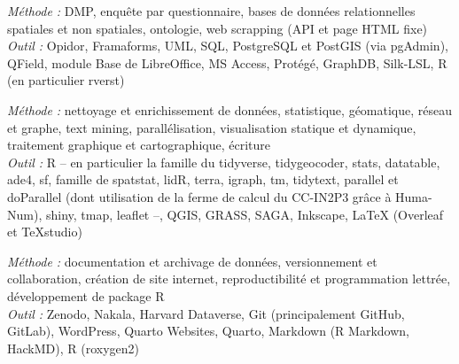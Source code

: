

\begin{small} \color{black}
\textit{Méthode :} DMP, enquête par questionnaire, bases de données relationnelles spatiales et non spatiales, ontologie, web scrapping (API et page HTML fixe) \\
\textit{Outil :} Opidor, Framaforms, UML, SQL, PostgreSQL et PostGIS (via pgAdmin), QField, module Base de LibreOffice, MS Access, Protégé, GraphDB, Silk-LSL, R (en particulier rverst)
\end{small}


\begin{small} \color{black}
\textit{Méthode :}  nettoyage et enrichissement de données, statistique, géomatique, réseau et graphe, text mining, parallélisation, visualisation statique et dynamique, traitement graphique et cartographique, écriture \\
\textit{Outil :} R -- en particulier la famille du tidyverse, tidygeocoder, stats, datatable, ade4, sf, famille de spatstat, lidR, terra, igraph, tm, tidytext, parallel et doParallel (dont utilisation de la ferme de calcul du CC-IN2P3 grâce à Huma-Num), shiny, tmap, leaflet --, QGIS, GRASS, SAGA, Inkscape, LaTeX (Overleaf et TeXstudio)
\end{small}


\begin{small} \color{black}
\textit{Méthode :} documentation et archivage de données, versionnement et collaboration, création de site internet, reproductibilité et programmation lettrée, développement de package R \\
\textit{Outil :} Zenodo, Nakala, Harvard Dataverse, Git (principalement GitHub, GitLab), WordPress, Quarto Websites, Quarto, Markdown (R Markdown, HackMD), R (roxygen2)
\end{small}

